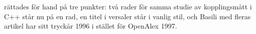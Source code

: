  rättades för hand på tre punkter: två rader
för samma studie av kopplingsmått i C++ står nu på en rad, en titel i
versaler står i vanlig stil, och Basili med fleras artikel har sitt
tryckår 1996 i stället för OpenAlex 1997.

